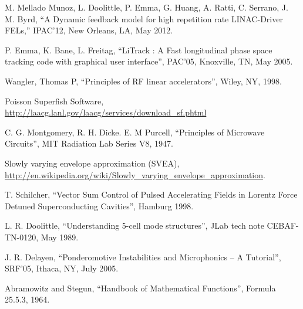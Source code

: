 \documentclass[a4paper,12pt]{article}
\begin{document}
\newpage

\begin{thebibliography}{19}   %

M. Mellado Munoz, L. Doolittle, P. Emma, G. Huang, A. Ratti, C. Serrano, J. M. Byrd, ``A Dynamic feedback model for high repetition rate LINAC-Driver FELs,''
IPAC'12, New Orleans, LA, May 2012.

P. Emma, K. Bane, L. Freitag, ``LiTrack : A Fast longitudinal phase space tracking code with graphical user interface'', PAC'05,  Knoxville, TN, May 2005.

Wangler, Thomas P, ``Principles of RF linear accelerators'', Wiley, NY, 1998.

Poisson Superfish Software, \url{http://laacg.lanl.gov/laacg/services/download_sf.phtml}

C. G. Montgomery, R. H. Dicke. E. M Purcell, ``Principles of Microwave Circuits'', MIT Radiation Lab Series V8, 1947.

Slowly varying envelope approximation (SVEA), \url{http://en.wikipedia.org/wiki/Slowly_varying_envelope_approximation}.

T. Schilcher, ``Vector Sum Control of Pulsed Accelerating Fields in Lorentz Force Detuned Superconducting Cavities'', Hamburg 1998.

L. R. Doolittle, ``Understanding 5-cell mode structures'', JLab tech note CEBAF-TN-0120, May 1989.

J. R. Delayen, ``Ponderomotive Instabilities and Microphonics -- A Tutorial'', SRF'05, Ithaca, NY, July 2005.

Abramowitz and Stegun, ``Handbook of Mathematical Functions'', Formula 25.5.3, 1964.


\end{thebibliography}
\end{document}
